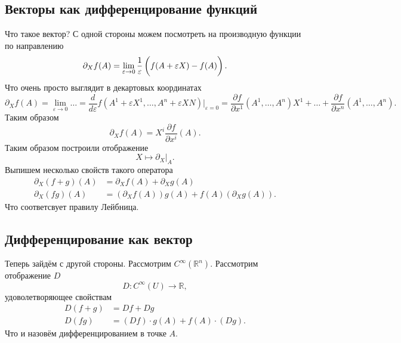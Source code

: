 \subsection{Векторы как дифференцирование функций}

Что такое вектор? С одной стороны можем посмотреть на производную функции по направлению
\begin{equation}
    \partial_{X} f(A) = \lim_{\varepsilon \to 0} \frac{1}{\varepsilon} 
    \left(
        f(A + \varepsilon X) - f(A) \vphantom{\frac{1}{2}}
    \right).
\end{equation}
Что очень просто выглядит в декартовых координатах
$$
    \partial_X f(A) =
    \lim_{\varepsilon \to 0} \ldots =
    \frac{d}{d\varepsilon} f\left(
        A^1 + \varepsilon X^1, \ldots, A^n + \varepsilon XN
    \right) \bigg|_{\varepsilon=0} =
    \frac{\partial f}{\partial x^1} \left(A^1, \ldots, A^n\right) X^1 +
    \ldots +
    \frac{\partial f}{\partial x^n} \left(A^1, \ldots, A^n\right).
$$
Таким образом
\begin{equation}
    \partial_X f(A) = X^i \frac{\partial f}{\partial x^i} (A).
\end{equation}
Таким образом построили отображение
\begin{equation*}
    X \mapsto \partial_X \big|_A.
\end{equation*}
Выпишем несколько свойств такого оператора
\begin{align*}
    \partial_X (f+g)(A) &= \partial_X f(A) + \partial_X g(A) \\
    \partial_X (fg) (A) &=   (\partial_X f(A)) g(A) + f(A) (\partial_X g(A)).
\end{align*}
Что соответсвует правилу Лейбница.

\subsection{Дифференцирование как вектор}

Теперь зайдём с другой стороны. Рассмотрим $C^{\infty} (\mathbb{R}^n)$. Рассмотрим отображение $D$
\begin{equation*}
    D \colon C^\infty (U) \to \mathbb{R},
\end{equation*}
удоволетворяющее свойствам
\begin{align*}
    D(f+g) &= Df + Dg \\
    D(fg) &= (Df) \cdot g(A) + f(A) \cdot (Dg).
\end{align*}
Что и назовём дифференцированием в точке $A$. 

